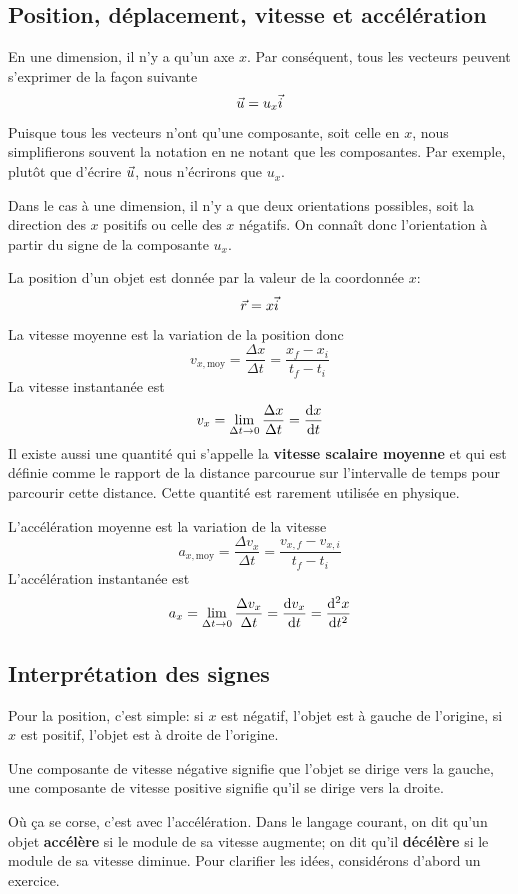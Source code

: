 \subsection{Position, déplacement, vitesse et accélération}

En une dimension, il n'y a qu'un axe $x$.  Par conséquent, tous les vecteurs
peuvent s'exprimer de la façon suivante
\[
  \vec{u} = u_x \vec{i}
\]
Puisque tous les vecteurs n'ont qu'une composante, soit celle en $x$, nous
simplifierons souvent la notation en ne notant que les composantes.  Par
exemple, plutôt que d'écrire $\vec{u}$, nous n'écrirons que $u_x$.

Dans le cas à une dimension, il n'y a que deux orientations possibles, soit la
direction des $x$ positifs ou celle des $x$ négatifs.  On connaît donc
l'orientation à partir du signe de la composante $u_x$.

La position d'un objet est donnée par la valeur de la coordonnée $x$:
\[
  \vec{r} = x \vec{i}
\]
La vitesse moyenne est la variation de la position donc
\[
  v_{x, \mathrm{moy}} = \frac{\Delta x}{\Delta t} = \frac{x_f - x_i}{t_f - t_i}
\]
La vitesse instantanée est
\[
  v_x = \lim_{\Delta t \rightarrow 0} \frac{\Delta x}{\Delta t} = \frac{\mathrm{d}x}{\mathrm{d}t}
\]
Il existe aussi une quantité qui s'appelle la \textbf{vitesse scalaire moyenne}
et qui est définie comme le rapport de la distance parcourue sur l'intervalle
de temps pour parcourir cette distance.  Cette quantité est rarement utilisée
en physique.

L'accélération moyenne est la variation de la vitesse
\[
  a_{x, \mathrm{moy}} = \frac{\Delta v_x}{\Delta t} = \frac{v_{x,f} - v_{x,i}}{t_f - t_i} 
\]
L'accélération instantanée est
\[
  a_x = \lim_{\Delta t \rightarrow 0} \frac{\Delta v_x}{\Delta t} = \frac{\mathrm{d}v_x}{\mathrm{d}t} =
        \frac{\mathrm{d}{}^2x}{\mathrm{d}t^2}
\]


\subsection{Interprétation des signes}

Pour la position, c'est simple: si $x$ est négatif, l'objet est à gauche de
l'origine, si $x$ est positif, l'objet est à droite de l'origine.

Une composante de vitesse négative signifie que l'objet se dirige vers la
gauche, une composante de vitesse positive signifie qu'il se dirige vers la
droite.

Où ça se corse, c'est avec l'accélération.  Dans le langage courant, on dit
qu'un objet \textbf{accélère} si le module de sa vitesse augmente; on dit qu'il
\textbf{décélère} si le module de sa vitesse diminue.  Pour clarifier les
idées, considérons d'abord un exercice.

